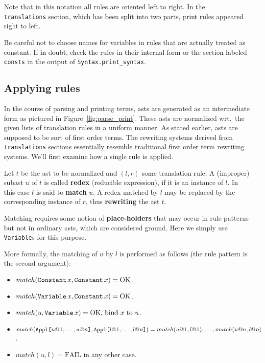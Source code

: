 Note that in this notation all rules are oriented left to right. In the {\tt
translations} section, which has been split into two parts, print rules
appeared right to left.

\begin{warn}
Be careful not to choose names for variables in rules that are actually
treated as constant. If in doubt, check the rules in their internal form or
the section labeled {\tt consts} in the output of {\tt Syntax.print_syntax}.
\end{warn}


\subsection{Applying rules}

In the course of parsing and printing terms, asts are generated as an
intermediate form as pictured in Figure~\ref{fig:parse_print}. These asts are
normalized wrt.\ the given lists of translation rules in a uniform manner. As
stated earlier, asts are supposed to be sort of first order terms. The
rewriting systems derived from {\tt translations} sections essentially
resemble traditional first order term rewriting systems. We'll first examine
how a single rule is applied.

Let $t$ be the ast to be normalized and $(l, r)$ some translation rule. A
(improper) subast $u$ of $t$ is called {\bf redex}
(reducible expression), if it is an instance of $l$. In this case $l$ is said
to {\bf match} $u$. A redex matched by $l$ may be
replaced by the corresponding instance of $r$, thus {\bf
rewriting} the ast $t$.

Matching requires some notion of {\bf place-holders} that may occur in rule patterns but not in ordinary asts, which are
considered ground. Here we simply use {\tt Variable}s for this purpose.

More formally, the matching of $u$ by $l$ is performed as follows (the rule
pattern is the second argument): 
\begin{itemize}
  \item $match(\mathop{\mbox{\tt Constant}}\nolimits x, \mathop{\mbox{\tt Constant}}\nolimits x) = \mbox{OK}$.

  \item $match(\mathop{\mbox{\tt Variable}}\nolimits x, \mathop{\mbox{\tt Constant}}\nolimits x) = \mbox{OK}$.

  \item $match(u, \mathop{\mbox{\tt Variable}}\nolimits x) = \mbox{OK, bind}~x~\mbox{to}~u$.

  \item $match(\mathop{\mbox{\tt Appl}}\nolimits\mathopen{\mbox{\tt [}}u@1, \ldots, u@n\mathclose{\mbox{\tt ]}}, \mathop{\mbox{\tt Appl}}\nolimits\mathopen{\mbox{\tt [}}l@1, \ldots, l@n\mathclose{\mbox{\tt ]}}) = match(u@1,
    l@1), \ldots, match(u@n, l@n)$.

  \item $match(u, l) = \mbox{FAIL}$ in any other case.
\end{itemize}

